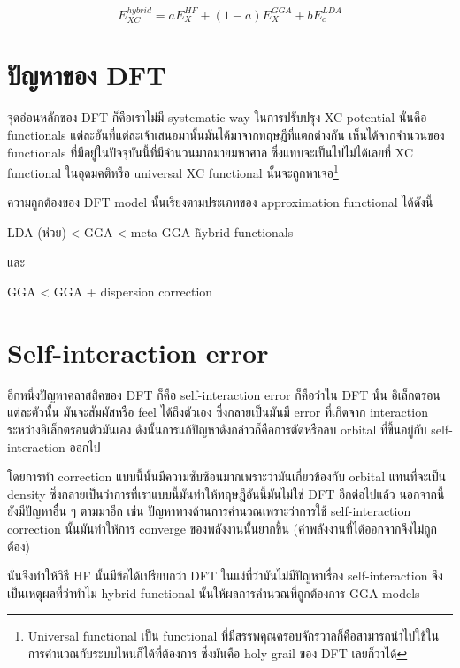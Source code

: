 \begin{equation}
    E^{hybrid}_{XC} = a E^{HF}_{X} + (1 - a) E^{GGA}_{X} + b E^{LDA}_{c}
\end{equation}

\section{ปัญหาของ DFT}

จุดอ่อนหลักของ DFT ก็คือเราไม่มี systematic way ในการปรับปรุง XC potential นั่นคือ functionals 
แต่ละอันที่แต่ละเจ้าเสนอมานั้นมันได้มาจากทฤษฎีที่แตกต่างกัน เห็นได้จากจำนวนของ functionals 
ที่มีอยู่ในปัจจุบันนี้ที่มีจำนวนมากมายมหาศาล ซึ่งแทบจะเป็นไปไม่ได้เลยที่ XC functional ในอุดมคติหรือ 
universal XC functional นั้นจะถูกหาเจอ\footnote{Universal functional เป็น functional 
ที่มีสรรพคุณครอบจักรวาลก็คือสามารถนำไปใช้ในการคำนวณกับระบบไหนก็ได้ที่ต้องการ ซึ่งมันคือ holy grail 
ของ DFT เลยก็ว่าได้}

ความถูกต้องของ DFT model นั้นเรียงตามประเภทของ approximation functional ได้ดังนี้ 

LDA (ห่วย) < GGA < meta-GGA \~ hybrid functionals 

\noindent และ 

GGA < GGA + dispersion correction 

\section{Self-interaction error}

อีกหนึ่งปัญหาคลาสสิคของ DFT ก็คือ self-interaction error ก็คือว่าใน DFT นั้น อิเล็กตรอนแต่ละตัวนั้น%
มันจะสัมผัสหรือ feel ได้ถึงตัวเอง ซึ่งกลายเป็นมันมี error ที่เกิดจาก interaction ระหว่างอิเล็กตรอนตัวมันเอง 
ดังนั้นการแก้ปัญหาดังกล่าวก็คือการตัดหรือลบ orbital ที่ขึ้นอยู่กับ self-interaction ออกไป 

โดยการทำ correction แบบนี้นั้นมีความซับซ้อนมากเพราะว่ามันเกี่ยวข้องกับ orbital แทนที่จะเป็น density 
ซึ่งกลายเป็นว่าการที่เราแบบนี้มันทำให้ทฤษฎีอันนี้มันไม่ใช่ DFT อีกต่อไปแล้ว นอกจากนี้ยังมีปัญหาอื่น ๆ ตามมาอีก เช่น 
ปัญหาทางด้านการคำนวณเพราะว่าการใช้ self-interaction correction นั้นมันทำให้การ converge 
ของพลังงานนั้นยากขึ้น (ค่าพลังงานที่ได้ออกจากจึงไม่ถูกต้อง)

นั่นจึงทำให้วิธี HF นั้นมีข้อได้เปรียบกว่า DFT ในแง่ที่ว่ามันไม่มีปัญหาเรื่อง self-interaction จึงเป็นเหตุผลที่ว่าทำไม 
hybrid functional นั้นให้ผลการคำนวณที่ถูกต้องการ GGA models 
